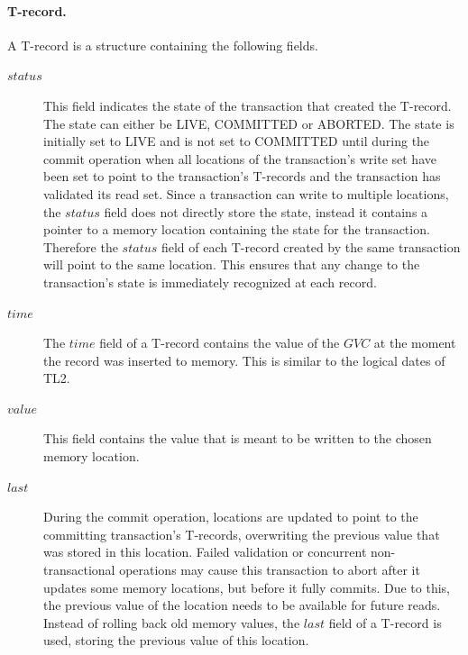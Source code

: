 \paragraph{T-record.}
A T-record is a structure containing the following fields.
\begin{description}
\item[$\mathit{status}$] This  field  indicates  the  state  of the  transaction  that  created  the
T-record. The  
state can either be LIVE, COMMITTED or ABORTED.
The state is initially set to LIVE and is not set to COMMITTED until during the commit operation when 
all locations of the transaction's write set have been set to point to the transaction's T-records
and the transaction has validated its read set.
Since a transaction can write to multiple locations, the $\mathit{status}$ field
does not directly store the state, instead it contains a
pointer to a memory location containing the state for the transaction.
Therefore the $\mathit{status}$ field of each T-record created by the same transaction will point to the same location.
This ensures that any change to the transaction's state is immediately recognized at each record.
\item[$\mathit{time}$] The  $\mathit{time}$  field of  a T-record  contains the  
value of  the $\mathit{GVC}$  at  the  moment the  record  was 
inserted to memory. %
This is similar to the logical dates of TL2.
\item[$\mathit{value}$] This field contains the value that is meant to be written to the chosen 
memory location.
\item[$\mathit{last}$] During the commit operation, locations are updated to point
to the committing transaction's T-records, overwriting the previous value
that was stored in this location.
Failed validation or concurrent non-transactional operations may cause this transaction to abort 
after it updates some memory locations, but before
it fully commits.
Due to this, the previous value of the location needs to be available for future reads.
Instead of rolling back old memory values, the $\mathit{last}$ field of a T-record is used,
storing the previous value of this location.

\end{description}


